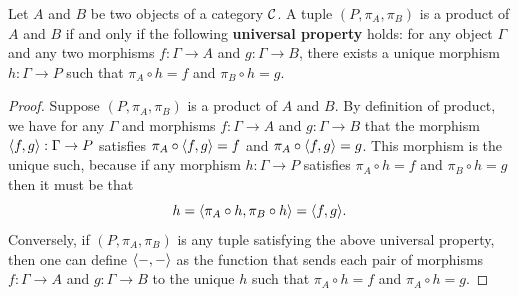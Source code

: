 \begin{proposition}
  Let \(A\) and \(B\) be two objects of a category \(\mathcal C\).
  A tuple \((P,\pi_A,\pi_B)\) is a product of \(A\) and \(B\)
  if and only if the following \textbf{universal property}
  holds:
  for any object \(\Gamma\) and any two morphisms \(f : \Gamma \to A\)
  and \(g : \Gamma \to B\),
  there exists a unique morphism \(h : \Gamma \to P\)
  such that \(\pi_A \circ h = f\) and \(\pi_B \circ h = g\).
\end{proposition}
\begin{proof}
  Suppose \((P,\pi_A,\pi_B)\) is a product of \(A\) and \(B\).
  By definition of product, we have for any \(\Gamma\) and morphisms \(f : \Gamma \to A\)
  and \(g : \Gamma \to B\)
  that the morphism \(\langle f,g\rangle : \Gamma \to P\)
  satisfies \(\pi_A \circ \langle f,g\rangle = f\)
  and \(\pi_A \circ \langle f,g\rangle = g\).
  This morphism is the unique such, because
  if any morphism \(h : \Gamma \to P\)
  satisfies \(\pi_A \circ h = f\) and \(\pi_B \circ h = g\)
  then it must be that
  \begin{equation}
    h = \langle \pi_A \circ h, \pi_B \circ h\rangle = \langle f,g\rangle.
  \end{equation}
  Conversely, if \((P,\pi_A,\pi_B)\) is any tuple satisfying
  the above universal property,
  then one can define \(\langle -,-\rangle\)
  as the function that sends each pair of morphisms \(f : \Gamma \to A\)
  and \(g : \Gamma\to B\)
to the unique \(h\) such that \(\pi_A \circ h = f\) and \(\pi_A \circ h = g\).
\end{proof}

